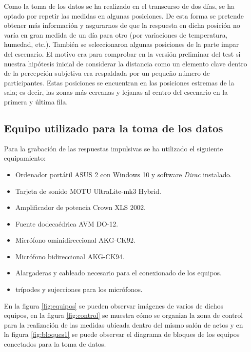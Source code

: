\documentclass[11pt,a4paper,twoside]{book}
\begin{document}
		    Como la toma de los datos se ha realizado en el transcurso de dos días, se ha optado por repetir las medidas en algunas posiciones. De esta forma se pretende obtener más información y asgurarnos de que la respuesta en dicha posición no varía en gran medida de un día para otro (por variaciones de temperatura, humedad, etc.). También se seleccionaron algunas posiciones de la parte impar del escenario. El motivo era para comprobar en la versión preliminar del test si nuestra hipótesis inicial de considerar la distancia como un elemento clave dentro de la percepción subjetiva era respaldada por un pequeño número de participantes. Estas posiciones se encuentran en las posiciones estremas de la sala; es decir, las zonas más cercanas y lejanas al centro del escenario en la primera y última fila. 

	    \subsection{Equipo utilizado para la toma de los datos}
	        Para la grabación de las respuestas impulsivas se ha utilizado el siguiente equipamiento:
	        \begin{itemize}
	            \item Ordenador portátil ASUS 2 con Windows 10 y software \textit{Dirac} instalado.
	            \item Tarjeta de sonido MOTU UltraLite-mk3 Hybrid.
	            \item Amplificador de potencia Crown XLS 2002.
	            \item Fuente dodecaédrica AVM DO-12.
	            \item Micrófono ominidireccional AKG-CK92.
	            \item Micrófono bidireccional AKG-CK94.
	            \item Alargaderas y cableado necesario para el conexionado de los equipos.
	            \item trípodes y sujecciones para los micrófonos.
	        
	        \end{itemize}
	    
	        En la figura \ref{fig:equipos} se pueden observar imágenes de varios de dichos equipos, en la figura \ref{fig:control} se muestra cómo se organiza la zona de control para la realización de las medidas ubicada dentro del mismo salón de actos y en la figura \ref{fig:bloques1} se puede observar el diagrama de bloques de los equipos conectados para la toma de datos.
	    
\end{document}
